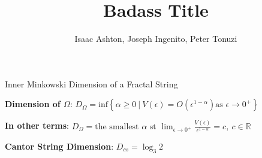 \documentclass{if-beamer}
\title[]{Badass Title}
\subtitle{}
\author{Isaac Ashton, Joseph Ingenito, Peter Tonuzi}
\institute[]{The College of New Jersey}
\date{}
\newcommand{\Om}{\Omega}
\begin{document}
\begin{frame}{Inner Minkowski Dimension of a Fractal String}

\begin{definition}
{\bf Dimension of $\Om$}: $D_\Om =\text{inf}\left\{ \alpha \geq 0\ |\ V(\epsilon)=O\left(\epsilon^{1-\alpha}\right) \text{as  } \epsilon \rightarrow 0^{+}\right\}$
\end{definition}

\pause
\vspace{.2 in}

{\bf In other terms}: $D_\Om = \text{the smallest  }\alpha \text{ st } \displaystyle \lim_{\epsilon \to 0^{+}} \frac{V(\epsilon)}{\epsilon^{1-\alpha}}=c, \ c\in \mathbb{R}$

\pause
\vspace{.2 in}

{\bf Cantor String Dimension}: $D_{cs} = \log_3 2$

\end{frame}
\end{document}
